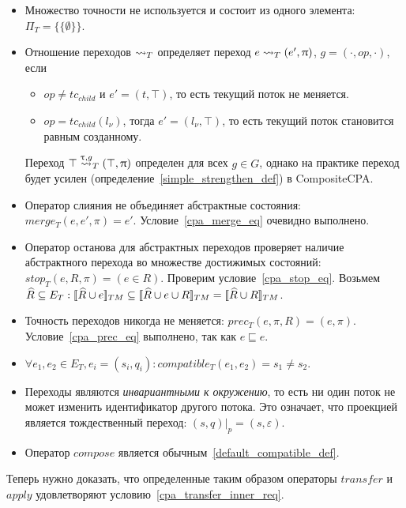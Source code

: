\begin{itemize}
\item Множество точности не используется и состоит из одного элемента: $\Pi_T = \{\{\emptyset\}\}$.

\item Отношение переходов $\leadsto_T$ определяет переход $e \leadsto_T (e', \uppi)$, $g=(\cdot,op,\cdot)$, если 
\begin{itemize}
\item $op\neq tc_{child}$ и $e' = (t, \top)$, то есть текущий поток не меняется.
\item $op=tc_{child}(l_\nu)$, тогда $e' = (l_\nu, \top)$, то есть текущий поток становится равным созданному.
\end{itemize}

Переход $\top \stackrel{\uptau, g}{\leadsto}_T (\top, \uppi)$ определен для всех $g\in G$, однако на практике переход будет усилен (определение~\ref{simple_strengthen_def}) в CompositeCPA.

\item Оператор слияния не объединяет абстрактные состояния: $merge_T(e, e', \pi) = e'$. Условие~\ref{cpa_merge_eq} очевидно выполнено.

\item Оператор останова для абстрактных переходов проверяет наличие абстрактного перехода во множестве достижимых состояний: $stop_T(e, R, \pi) = (e \in R)$.
Проверим условие~\ref{cpa_stop_eq}.
Возьмем $\widehat{R} \subseteq E_T: [\![ \widehat{R} \cup e ]\!]_{TM} \subseteq [\![ \widehat{R} \cup e \cup R ]\!]_{TM} = [\![ \widehat{R} \cup R ]\!]_{TM}$.

\item Точность переходов никогда не меняется: $prec_T(e, \pi, R) = (e, \pi)$. Условие~\ref{cpa_prec_eq} выполнено, так как $e \sqsubseteq e$.

\item $\forall e_1, e_2 \in E_T, e_i = (s_i, q_i):compatible_T(e_1,e_2) = s_1 \neq s_2$.

\item Переходы являются {\em инвариантными к окружению}, то есть ни один поток не может изменить идентификатор другого потока.
Это означает, что проекцией является тождественный переход:
$(s, q)|_p = (s, \varepsilon)$.

\item Оператор $compose$ является обычным~\ref{default_compatible_def}.
\end{itemize}

Теперь нужно доказать, что определенные таким образом операторы $transfer$ и $apply$ удовлетворяют условию~\ref{cpa_transfer_inner_req}.

